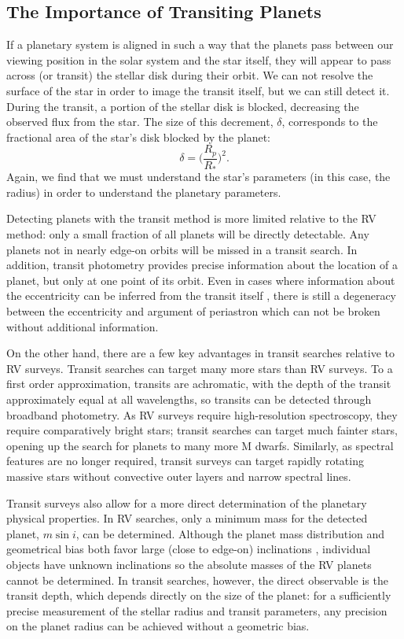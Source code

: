 \subsection{The Importance of Transiting Planets}
If a planetary system is aligned in such a way that the planets pass between our
viewing position in the solar system and the star itself, they will appear to pass
across (or transit) the stellar disk during their orbit.
We can not resolve the surface of the star in order to image the transit itself, but
we can still detect it. 
During the transit, a portion of the stellar disk is blocked, decreasing the observed
flux from the star. 
The size of this decrement, $\delta$, corresponds to the fractional area of the star's disk blocked by the planet:
\begin{equation}
\delta = \bigg(\frac{R_p}{R_*}\bigg)^2.
\end{equation}
Again, we find that we must understand the star's parameters (in this case, the radius)
in order to understand the planetary parameters.

Detecting planets with the transit method is more limited relative to the RV method:
only a small fraction of all planets will be directly detectable. 
Any planets not in nearly edge-on orbits will be missed in a transit search.
In addition, transit photometry provides precise information about the location 
of a planet, but only at one point of its orbit.
Even in cases where information about the eccentricity can be inferred from the
transit itself \citep{Dawson12a}, there is still a degeneracy
between the eccentricity and argument of periastron which can not be broken without
additional information.

On the other hand, there are a few key advantages in transit searches relative to 
RV surveys. 
Transit searches can target many more stars than RV surveys. 
To a first order approximation, transits are achromatic, with the depth of the transit
approximately equal at all wavelengths, so transits can be detected through broadband
photometry.
As RV surveys require high-resolution spectroscopy, they require comparatively bright
stars; transit searches can target much fainter stars, opening up the search
for planets to many more M dwarfs.
Similarly, as spectral features are no longer required, transit surveys can target 
rapidly rotating massive stars without convective outer layers and narrow spectral lines.

Transit surveys also allow for a more direct determination of the planetary physical 
properties. 
In RV searches, only a minimum mass
for the detected planet, $m \sin i$, can be determined. 
Although the planet mass distribution and geometrical bias both favor large
(close to edge-on) inclinations \citep{Ho11}, individual objects have unknown inclinations
so the absolute masses of the RV planets cannot be determined.
In transit searches, however, the direct observable is the transit depth, which depends
directly on the size of the planet: for a sufficiently precise measurement of the stellar
radius and transit parameters, any precision on the planet radius can be achieved without
a geometric bias.

